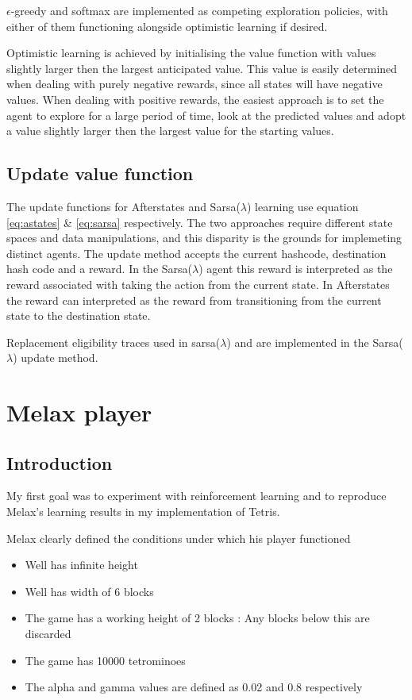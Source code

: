 \documentclass{rucsthesis}
\begin{document}
$\epsilon$-greedy and softmax are implemented as competing exploration policies, with either of them functioning alongside optimistic learning if desired. 

Optimistic learning is achieved by initialising the value function with values slightly larger then the largest anticipated value. This value is easily determined when dealing with purely negative rewards, since all states will have negative values. When dealing with positive rewards, the easiest approach is to set the agent to explore for a large period of time, look at the predicted values and adopt a value slightly larger then the largest value for the starting values.

\section{Update value function}

The update functions for Afterstates and Sarsa($\lambda$) learning use equation \ref{eq:astates} \& \ref{eq:sarsa} respectively. The two approaches require different state spaces and data manipulations, and this disparity is the grounds for implemeting distinct agents. The update method accepts the current hashcode, destination hash code and a reward. In the Sarsa($\lambda$) agent this reward is interpreted as the reward associated with taking the action from the current state. In Afterstates the reward can interpreted as the reward from transitioning from the current state to the destination state. 


Replacement eligibility traces used in sarsa($\lambda$) and are implemented in the Sarsa($\lambda$) update method. 

\chapter{Melax player}

\section{Introduction}

My first goal was to experiment with reinforcement learning and to reproduce Melax's learning results in my implementation of Tetris.  

Melax clearly defined the conditions under which his player functioned

\begin{itemize}
\item{Well has infinite height}
\item{Well has width of 6 blocks}
\item{The game has a working height of 2 blocks : Any blocks below this are discarded}
\item{The game has 10000 tetrominoes}
\item{The alpha and gamma values are defined as 0.02 and 0.8 respectively}
\end{itemize}
\end{document}
